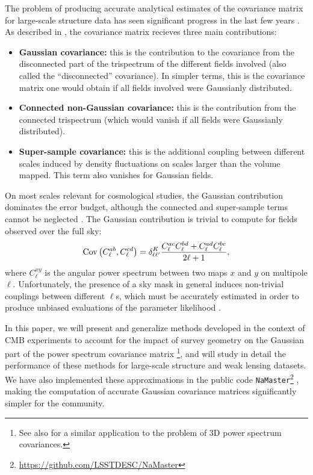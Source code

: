 \documentclass[a4paper,11pt]{article}
\begin{document}
    The problem of producing accurate analytical estimates of the covariance matrix for large-scale structure data has seen significant progress in the last few years \cite{2001ApJ...554...56C,2009ApJ...701..945S,2009MNRAS.395.2065T,2013PhRvD..87l3504T,2014MNRAS.441.2456T,2016PhRvD..94f3533P}. As described in \cite{2018JCAP...10..053B}, the covariance matrix recieves three main contributions:
    \begin{itemize}
      \item {\bf Gaussian covariance:} this is the contribution to the covariance from the disconnected part of the trispectrum of the different fields involved (also called the ``disconnected'' covariance). In simpler terms, this is the covariance matrix one would obtain if all fields involved were Gaussianly distributed.
      \item {\bf Connected non-Gaussian covariance:} this is the contribution from the connected trispectrum (which would vanish if all fields were Gaussianly distributed).
      \item {\bf Super-sample covariance:} this is the additional coupling between different scales induced by density fluctuations on scales larger than the volume mapped. This term also vanishes for Gaussian fields.
    \end{itemize}
  
    On most scales relevant for cosmological studies, the Gaussian contribution dominates the error budget, although the connected and super-sample terms cannot be neglected \cite{2018JCAP...10..053B}. The Gaussian contribution is trivial to compute for fields observed over the full sky:
    \begin{equation}\label{eq:cov_naive}
      {\rm Cov}\left(C^{ab}_\ell,C^{cd}_\ell\right)=\delta^K_{\ell\ell'}\frac{C^{ac}_\ell C^{bd}_\ell+C^{ad}_\ell C^{bc}_\ell}{2\ell+1},
    \end{equation}
    where $C^{xy}_\ell$ is the angular power spectrum between two maps $x$ and $y$ on multipole $\ell$. Unfortunately, the presence of a sky mask in general induces non-trivial couplings between different $\ell$s, which must be accurately estimated in order to produce unbiased evaluations of the parameter likelihood \cite{2018MNRAS.479.4998T}.
  
    In this paper, we will present and generalize methods developed in the context of CMB experiments to account for the impact of survey geometry on the Gaussian part of the power spectrum covariance matrix \cite{2004MNRAS.349..603E,2005MNRAS.360.1262B,2017A&A...602A..41C}\footnote{See also \cite{2019JCAP...01..016L} for a similar application to the problem of 3D power spectrum covariances.}, and will study in detail the performance of these methods for large-scale structure and weak lensing datasets. We have also implemented these approximations in the public code {\tt NaMaster}\footnote{\url{https://github.com/LSSTDESC/NaMaster}} \cite{2019MNRAS.484.4127A}, making the computation of accurate Gaussian covariance matrices significantly simpler for the community.
\end{document}
